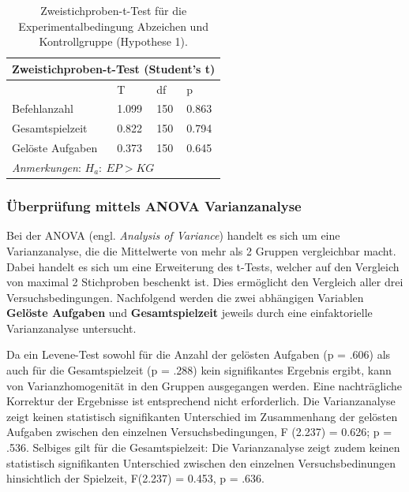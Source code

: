 \begin{table}[htbp]
\centering
\caption{Zweistichproben-t-Test für die Experimentalbedingung Abzeichen und Kontrollgruppe (Hypothese 1).}
\begin{tabular}{ |p{4cm}||p{2.0cm}|p{2.0cm}|p{2.0cm}| }
 \hline
 \multicolumn{4}{|c|}{Zweistichproben-t-Test (Student's t)} \\
 \hline
 & T &df & p \\
 \hline
  Befehlanzahl       & 1.099   &   150 & 0.863\\
  Gesamtspielzeit    & 0.822   &   150 & 0.794\\
  Gelöste Aufgaben   & 0.373   &   150 & 0.645\\
 \hline
 \multicolumn{4}{l}{%
 \small%
\textit{Anmerkungen}: $H_a:\: EP > KG$
}\\
\end{tabular}
\label{ttest_hypo_2}
\end{table}





\subsubsection{Überprüfung mittels ANOVA Varianzanalyse }
Bei der ANOVA (engl. \textit{Analysis of Variance}) handelt es sich um eine Varianzanalyse, die die Mittelwerte von mehr als 2 Gruppen vergleichbar macht. Dabei handelt es sich um eine Erweiterung des t-Tests, welcher auf den Vergleich von maximal 2 Stichproben beschenkt ist. Dies ermöglicht den Vergleich aller drei Versuchsbedingungen. Nachfolgend werden die zwei abhängigen Variablen \textbf{Gelöste Aufgaben} und \textbf{Gesamtspielzeit} jeweils durch eine einfaktorielle Varianzanalyse untersucht.

Da ein Levene-Test sowohl für die Anzahl der gelösten Aufgaben (p = .606) als auch für die Gesamtspielzeit (p = .288) kein signifikantes Ergebnis ergibt, kann von Varianzhomogenität in den Gruppen ausgegangen werden. Eine nachträgliche Korrektur der Ergebnisse ist entsprechend nicht erforderlich. Die Varianzanalyse zeigt keinen statistisch signifikanten Unterschied im Zusammenhang der gelösten Aufgaben zwischen den einzelnen Versuchsbedingungen, F (2.237) = 0.626; p = .536. Selbiges gilt für die Gesamtspielzeit: Die Varianzanalyse zeigt zudem keinen statistisch  signifikanten Unterschied zwischen den einzelnen Versuchsbedinungen hinsichtlich der Spielzeit,  F(2.237) = 0.453, p = .636.


